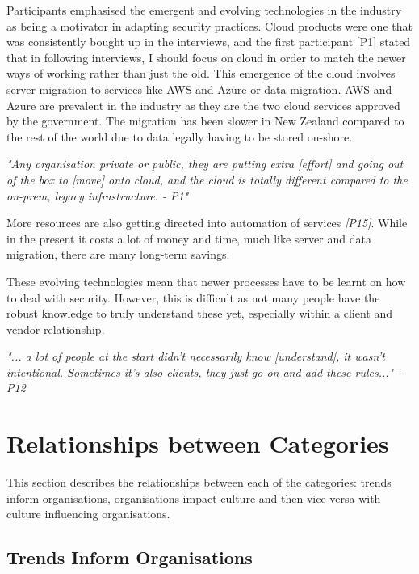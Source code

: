 Participants emphasised the emergent and evolving technologies in the industry as being a motivator in adapting security practices. Cloud products were one that was consistently bought up in the interviews, and the first participant [P1] stated that in following interviews, I should focus on cloud in order to match the newer ways of working rather than just the old. This emergence of the cloud involves server migration to services like AWS and Azure or data migration. AWS and Azure are prevalent in the industry as they are the two cloud services approved by the government.  The migration has been slower in New Zealand compared to the rest of the world due to data legally having to be stored on-shore. 
\newline
\par
\textit{"Any organisation private or public, they are putting extra [effort] and going out of the box to [move] onto cloud, and the cloud is totally different compared to the on-prem, legacy infrastructure. - P1"}
\newline
\par 
More resources are also getting directed into automation of services \textit{[P15]}. While in the present it costs a lot of money and time, much like server and data migration, there are many long-term savings. 
\newline
\par
These evolving technologies mean that newer processes have to be learnt on how to deal with security. However, this is difficult as not many people have the robust knowledge to truly understand these yet, especially within a client and vendor relationship. 
\newline
\par
\textit{"... a lot of people at the start didn't necessarily know [understand], it wasn't intentional. Sometimes it's also clients, they just go on and add these rules..." -P12}

\section{Relationships between Categories}

\par This section describes the relationships between each of the categories: trends inform organisations, organisations impact culture and then vice versa with culture influencing organisations. 

\subsection{Trends Inform Organisations}

